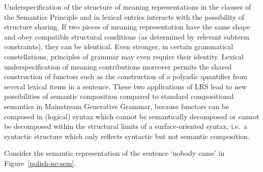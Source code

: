 \documentclass[output=paper,biblatex,babelshorthands,newtxmath,draftmode,colorlinks,citecolor=brown]{langscibook}
\begin{document}
Underspecification of the structure of meaning representations in the
clauses of the Semantics Principle and in lexical entries interacts
with the possibility of structure sharing. If two pieces of meaning
representation have the same shape and obey compatible structural
conditions (as determined by relevant subterm constraints), they can be
identical. Even stronger, in certain grammatical constellations,
principles of grammar may even require their
identity. Lexical underspecification of meaning contributions moreover
permits the shared construction of functors such as the construction
of a polyadic quantifier from several lexical items in a
sentence. These two applications of LRS lead to new possibilities
of semantic composition compared to standard compositional semantics
in Mainstream Generative Grammar, because functors can be composed in (logical) syntax
which cannot be semantically decomposed or cannot be decomposed within
the structural limits of a surface-oriented syntax, i.e.\ a syntactic
structure which only reflects syntactic but not semantic composition.





Consider the semantic representation of the  sentence  `nobody came' in Figure~\ref{polish-nc-sem}. 

\end{document}
